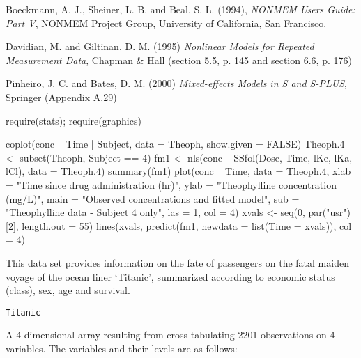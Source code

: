 %
\begin{Source}\relax
Boeckmann, A. J., Sheiner, L. B. and Beal, S. L. (1994), \emph{NONMEM
Users Guide: Part V}, NONMEM Project Group, University of
California, San Francisco.

Davidian, M. and Giltinan, D. M. (1995) \emph{Nonlinear Models for
Repeated Measurement Data}, Chapman \& Hall (section 5.5, p. 145 and
section 6.6, p. 176)

Pinheiro, J. C. and Bates, D. M. (2000) \emph{Mixed-effects Models in
S and S-PLUS}, Springer (Appendix A.29)
\end{Source}
%
\begin{SeeAlso}\relax
{}
\end{SeeAlso}
%
\begin{Examples}
\begin{ExampleCode}
require(stats); require(graphics)

coplot(conc ~ Time | Subject, data = Theoph, show.given = FALSE)
Theoph.4 <- subset(Theoph, Subject == 4)
fm1 <- nls(conc ~ SSfol(Dose, Time, lKe, lKa, lCl),
           data = Theoph.4)
summary(fm1)
plot(conc ~ Time, data = Theoph.4,
     xlab = "Time since drug administration (hr)",
     ylab = "Theophylline concentration (mg/L)",
     main = "Observed concentrations and fitted model",
     sub  = "Theophylline data - Subject 4 only",
     las = 1, col = 4)
xvals <- seq(0, par("usr")[2], length.out = 55)
lines(xvals, predict(fm1, newdata = list(Time = xvals)),
      col = 4)
\end{ExampleCode}
\end{Examples}
%
\begin{Description}\relax
This data set provides information on the fate of passengers on the
fatal maiden voyage of the ocean liner `Titanic', summarized according
to economic status (class), sex, age and survival.
\end{Description}
%
\begin{Usage}
\begin{verbatim}
Titanic
\end{verbatim}
\end{Usage}
%
\begin{Format}
A 4-dimensional array resulting from cross-tabulating 2201
observations on 4 variables.  The variables and their levels are as
follows:


\end{Format}
